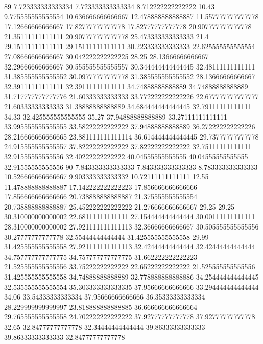 89 7.723333333333334 7.723333333333334 8.712222222222222 10.43 9.775555555555554 10.636666666666667 12.478888888888887 11.557777777777778 17.12666666666667 17.82777777777778 17.82777777777778 20.907777777777778 21.35111111111111 20.907777777777778 25.473333333333333 21.4 29.15111111111111 29.15111111111111 30.223333333333333 22.625555555555554 27.08666666666667 30.042222222222225 28.25 28.13666666666667 32.29666666666667 30.555555555555557 30.344444444444445 32.48111111111111 31.385555555555552 30.09777777777778 31.385555555555552 28.13666666666667 32.39111111111111 32.39111111111111 34.74888888888889 34.74888888888889 31.717777777777776 21.60333333333333 33.772222222222226 22.677777777777777 21.60333333333333 31.38888888888889 34.684444444444445 32.79111111111111 34.33 32.425555555555555 35.27 37.94888888888889 33.27111111111111 33.995555555555555 33.58222222222222 37.94888888888889 36.272222222222226 28.216666666666665 23.881111111111114 36.614444444444445 29.73777777777778 24.915555555555557 37.82222222222222 37.82222222222222 32.75111111111111 32.91555555555556 32.40222222222222 40.04555555555555 40.04555555555555 32.91555555555556
90 7.843333333333333 7.843333333333333 8.783333333333333 10.526666666666667 9.903333333333332 10.72111111111111 12.55 11.478888888888887 17.142222222222223 17.856666666666666 17.856666666666666 20.738888888888887 21.375555555555554 20.738888888888887 25.452222222222222 21.276666666666667 29.25 29.25 30.310000000000002 22.68111111111111 27.154444444444444 30.00111111111111 28.310000000000002 27.921111111111113 32.36666666666667 30.505555555555556 30.27777777777778 32.55444444444444 31.425555555555558 29.99 31.425555555555558 27.921111111111113 32.42444444444444 32.42444444444444 34.757777777777775 34.757777777777775 31.662222222222223 21.525555555555556 33.75222222222222 22.65222222222222 21.525555555555556 31.425555555555558 34.74888888888889 32.778888888888886 34.254444444444445 32.535555555555554 35.303333333333335 37.95666666666666 33.294444444444444 34.06 33.54333333333334 37.95666666666666 36.35333333333334 28.229999999999997 23.818888888888885 36.666666666666664 29.765555555555558 24.702222222222222 37.92777777777778 37.92777777777778 32.65 32.84777777777778 32.34444444444444 39.86333333333333 39.86333333333333 32.84777777777778
